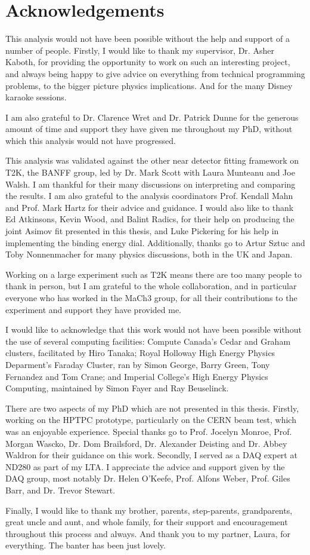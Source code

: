 \chapter*{Acknowledgements}

This analysis would not have been possible without the help and support of a number of people. Firstly, I would like to thank my supervisor, Dr. Asher Kaboth, for providing the opportunity to work on such an interesting project, and always being happy to give advice on everything from technical programming problems, to the bigger picture physics implications. And for the many Disney karaoke sessions.

I am also grateful to Dr. Clarence Wret and Dr. Patrick Dunne for the generous amount of time and support they have given me throughout my PhD, without which this analysis would not have progressed.

This analysis was validated against the other near detector fitting framework on T2K, the BANFF group, led by Dr. Mark Scott with Laura Munteanu and Joe Walsh. I am thankful for their many discussions on interpreting and comparing the results. I am also grateful to the analysis coordinators Prof. Kendall Mahn and Prof. Mark Hartz for their advice and guidance. I would also like to thank Ed Atkinsons, Kevin Wood, and Balint Radics, for their help on producing the joint Asimov fit presented in this thesis, and Luke Pickering for his help in implementing the binding energy dial. Additionally, thanks go to Artur Sztuc and Toby Nonnenmacher for many physics discussions, both in the UK and Japan.

Working on a large experiment such as T2K means there are too many people to thank in person, but I am grateful to the whole collaboration, and in particular everyone who has worked in the MaCh3 group, for all their contributions to the experiment and support they have provided me.

I would like to acknowledge that this work would not have been possible without the use of several computing facilities: Compute Canada's Cedar and Graham clusters, facilitated by Hiro Tanaka; Royal Holloway High Energy Physics Deparment's Faraday Cluster, ran by Simon George, Barry Green, Tony Fernandez and Tom Crane; and Imperial College's High Energy Physics Computing, maintained by Simon Fayer and Ray Beuselinck.

There are two aspects of my PhD which are not presented in this thesis. Firstly, working on the HPTPC prototype, particularly on the CERN beam test, which was an enjoyable experience. Special thanks go to Prof. Jocelyn Monroe, Prof. Morgan Wascko, Dr. Dom Brailsford, Dr. Alexander Deisting and Dr. Abbey Waldron for their guidance on this work. Secondly, I served as a DAQ expert at ND280 as part of my LTA. I appreciate the advice and support given by the DAQ group, most notably Dr. Helen O'Keefe, Prof. Alfons Weber, Prof. Giles Barr, and Dr. Trevor Stewart.

Finally, I would like to thank my brother, parents, step-parents, grandparents, great uncle and aunt, and whole family, for their support and encouragement throughout this process and always. And thank you to my partner, Laura, for everything. The banter has been just lovely.

\newpage